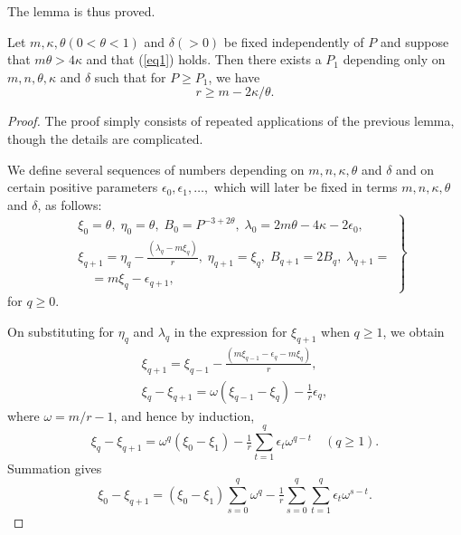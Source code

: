The lemma is thus proved.
\begin{lemma}\label{lem1.6}
Let $m,\kappa,\theta(0<\theta<1)$ and $\delta(>0)$ be fixed independently 
of $P$ and suppose that $m\theta >4\kappa$ and that (\ref{eq1}) holds. Then 
there exists a $P_1$ depending only on $m,n,\theta,\kappa$ and $\delta$ 
such that for $P\geq P_1$, we have 
$$r
\geq m-2\kappa/\theta.
$$
\end{lemma}
\begin{proof}
The proof simply consists of repeated applications of the previous 
lemma, though the details are complicated.

We define several sequences of numbers depending on $m,n,\kappa,\theta$ and 
$\delta$ and on certain positive parameters 
$\epsilon_0,\epsilon_1,\ldots,$ which will later be fixed in terms 
$m,n,\kappa,\theta$ and $\delta$, as follows:
\begin{equation}\label{eq3}
\left.
\begin{aligned}
&\xi_0=\theta,\;\eta_0=\theta,\;B_0=P^{-3+2\theta},\;\lambda_0=2m\theta 
-4\kappa-2\epsilon_0,\\
&\xi_{q+1}=\eta_q-\frac{(\lambda_q-m\xi_q)}{r},\;\eta_{q+1}=\xi_q,\; 
B_{q+1}=2B_q,\;\lambda_{q+1}=\\ 
&\quad =m\xi_q-\epsilon_{q+1},
\end{aligned}
\right\}
\end{equation}
for $q\geq 0$.

On substituting for $\eta_q$ and $\lambda_q$ in the expression for 
$\xi_{q+1}$ when $q\geq 1$, we obtain 
\begin{gather*}
\xi_{q+1}=\xi_{q-1}-\frac{(m\xi_{q-1}-\epsilon_q-m\xi_q)}{r},\\
\xi_q-\xi_{q+1}=\omega(\xi_{q-1}-\xi_q)-\tfrac{1}{r}\epsilon_q,
\end{gather*}
where $\omega=m/r-1$, and hence by induction, 
$$
\xi_q-\xi_{q+1}=\omega^q(\xi_0-\xi_1)-\tfrac{1}{r} 
\sum\limits_{t=1}^q\epsilon_t\omega^{q-t}\quad (q\geq 1).
$$
Summation gives 
$$
\xi_0-\xi_{q+1}=(\xi_0-\xi_1)\sum\limits_{s=0}^q\omega^q-\tfrac{1}{r} 
\sum\limits_{s=0}^q\sum\limits_{t=1}^q\epsilon_t\omega^{s-t}.
$$


\end{proof}
